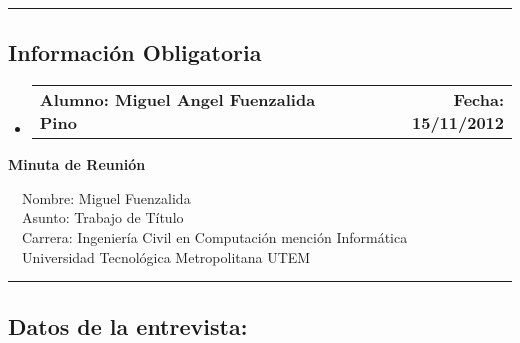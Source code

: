 \documentclass[10pt,letterpaper]{article}
\makeatletter
\newcommand{\headerrow}[2]
{\begin{tabular*}{\linewidth}{l@{\extracolsep{\fill}}r}
	#1 &
	#2 \\
\end{tabular*}}
\makeatother
\begin{document}
\hrule
\vspace{-0.4em}
\subsection*{Información Obligatoria}

\begin{itemize}
	\parskip=0.1em

	\item 
	\headerrow
		{\textbf{Alumno: Miguel Angel Fuenzalida Pino}}
		{\textbf{Fecha: 15/11/2012}}

\end{itemize}
\newpage
\begin{center}
{\LARGE \textbf{Minuta de Reunión}}

\ \ \textbullet Nombre: Miguel Fuenzalida
\\
\ \ \textbullet Asunto: Trabajo de Título
\\
\ \ \textbullet Carrera: Ingeniería Civil en Computación mención Informática
\\
\ \ \textbullet Universidad Tecnológica Metropolitana UTEM
\end{center}

\hrule
\vspace{-0.4em}
\subsection*{Datos de la entrevista:}
\end{document}
